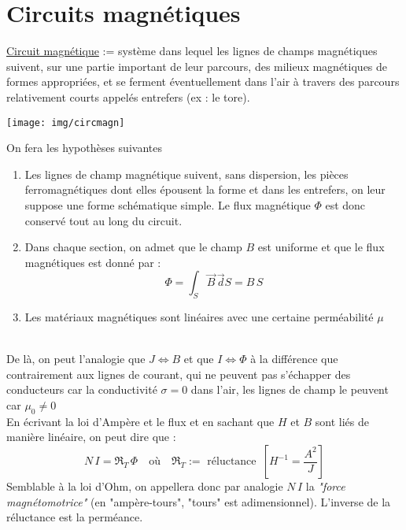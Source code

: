 \documentclass	[11pt, a4paper, openany]{book}
\begin{document}
\section{Circuits magnétiques}
\underline{Circuit magnétique} := système dans lequel les lignes de champs magnétiques suivent, sur une partie important de leur parcours, des milieux magnétiques de formes appropriées, et se ferment éventuellement dans l'air à travers des parcours relativement courts appelés entrefers (ex : le tore).\\\begin{center}\texttt{[image: img/circmagn]}\end{center}
On fera les hypothèses suivantes \begin{enumerate}
\item Les lignes de champ magnétique suivent, sans dispersion, les pièces ferromagnétiques dont elles épousent la forme et dans les entrefers, on leur suppose une forme schématique simple. Le flux magnétique $\Phi$ est donc conservé tout au long du circuit.
\item Dans chaque section, on admet que le champ $B$ est uniforme et que le flux magnétiques est donné par :\begin{equation}
\Phi=\int_S\vec B\,\vec dS=B\,S
\end{equation}
\item Les matériaux magnétiques sont linéaires avec une certaine perméabilité $\mu$
\end{enumerate}\ \\
De là, on peut l'analogie que $J\Leftrightarrow B$ et que $I\Leftrightarrow \Phi$ à la différence que contrairement aux lignes de courant, qui ne peuvent pas s'échapper des conducteurs car la conductivité $\sigma=0$  dans l'air, les lignes de champ le peuvent car $\mu_0\neq 0$\\

En écrivant la loi d'Ampère et le flux et en sachant que $H$ et $B$ sont liés de manière linéaire, on peut dire que : \begin{equation}\label{relcircmagn}
N\,I=\Re_T\,\Phi\quad\text{où}\quad\Re_T:=\text{ réluctance }\,\left[H^{-1}=\frac{A^2}{J}\right]
\end{equation}
Semblable à la loi d'Ohm, on appellera donc par analogie $N\,I$ la \textit{"force magnétomotrice"} (en "ampère-tours", "tours" est adimensionnel). L'inverse de la réluctance est la perméance.\\
\end{document}
